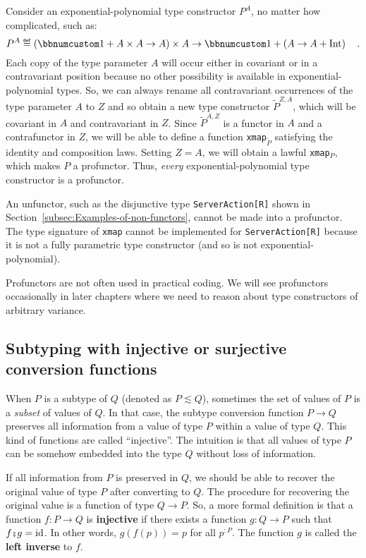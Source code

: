 Consider an exponential-polynomial type constructor $P^{A}$, no matter
how complicated, such as:
\[
P^{A}\triangleq\left(\bbnum 1+A\times A\rightarrow A\right)\times A\rightarrow\bbnum 1+\left(A\rightarrow A+\text{Int}\right)\quad.
\]
Each copy of the type parameter $A$ will occur either in covariant
or in a contravariant position because no other possibility is available
in exponential-polynomial types. So, we can always rename all contravariant
occurrences of the type parameter $A$ to $Z$ and so obtain a new
type constructor $\tilde{P}^{Z,A}$, which will be covariant in $A$
and contravariant in $Z$. Since $\tilde{P}^{A,Z}$ is a functor in
$A$ and a contrafunctor in $Z$, we will be able to define a function
\lstinline!xmap!$_{\tilde{P}}$ satisfying the identity and composition
laws. Setting $Z=A$, we will obtain a lawful \lstinline!xmap!$_{P}$,
which makes $P$ a profunctor. Thus, \emph{every} exponential-polynomial
type constructor is a profunctor.

An unfunctor, such as the disjunctive type \lstinline!ServerAction[R]!
shown in Section~\ref{subsec:Examples-of-non-functors}, cannot be
made into a profunctor. The type signature of \lstinline!xmap! cannot
be implemented for \lstinline!ServerAction[R]! because it is not
a fully parametric type constructor (and so is not exponential-polynomial).

Profunctors are not often used in practical coding. We will see profunctors
occasionally in later chapters where we need to reason about type
constructors of arbitrary variance.

\subsection{Subtyping with injective or surjective conversion functions\label{subsec:Subtyping-with-injective}}

When $P$ is a subtype of $Q$ (denoted as $P\lesssim Q$), sometimes
the set of values of $P$ is a \emph{subset} of values of $Q$. In
that case, the subtype conversion function
$P\rightarrow Q$ preserves all information from a value of type $P$
within a value of type $Q$. This kind of functions are called \textsf{``}injective\textsf{''}.
The intuition is that all values of type $P$ can be somehow embedded
into the type $Q$ without loss of information.

If all information from $P$ is preserved in $Q$, we should be able
to recover the original value of type $P$ after converting to $Q$.
The procedure for recovering the original value is a function of type
$Q\rightarrow P$. So, a more formal definition is that a function
$f:P\rightarrow Q$ is \textbf{injective}
if there exists a function $g:Q\rightarrow P$ such that $f\bef g=\text{id}$.
In other words, $g(f(p))=p$ for all $p^{:P}$. The function $g$
is called the \textbf{left inverse} to $f$. 

